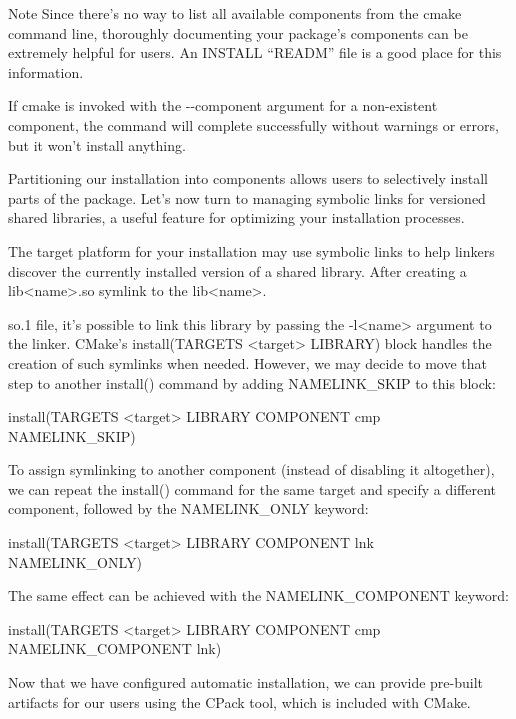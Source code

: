 \begin{myNotic}{Note}
Since there’s no way to list all available components from the cmake command line, thoroughly documenting your package’s components can be extremely helpful for users. An INSTALL “READM” file is a good place for this information.
\end{myNotic}

If cmake is invoked with the -{}-component argument for a non-existent component, the command will complete successfully without warnings or errors, but it won’t install anything.

Partitioning our installation into components allows users to selectively install parts of the package. Let’s now turn to managing symbolic links for versioned shared libraries, a useful feature for optimizing your installation processes.


The target platform for your installation may use symbolic links to help linkers discover the currently installed version of a shared library. After creating a lib<name>.so symlink to the lib<name>.

so.1 file, it’s possible to link this library by passing the -l<name> argument to the linker.
CMake’s install(TARGETS <target> LIBRARY) block handles the creation of such symlinks when needed. However, we may decide to move that step to another install() command by adding NAMELINK\_SKIP to this block:

\begin{shell}
install(TARGETS <target> LIBRARY
        COMPONENT cmp NAMELINK_SKIP)
\end{shell}

To assign symlinking to another component (instead of disabling it altogether), we can repeat the install() command for the same target and specify a different component, followed by the NAMELINK\_ONLY keyword:

\begin{shell}
install(TARGETS <target> LIBRARY
        COMPONENT lnk NAMELINK_ONLY)
\end{shell}

The same effect can be achieved with the NAMELINK\_COMPONENT keyword:

\begin{shell}
install(TARGETS <target> LIBRARY
        COMPONENT cmp NAMELINK_COMPONENT lnk)
\end{shell}

Now that we have configured automatic installation, we can provide pre-built artifacts for our users using the CPack tool, which is included with CMake.








































